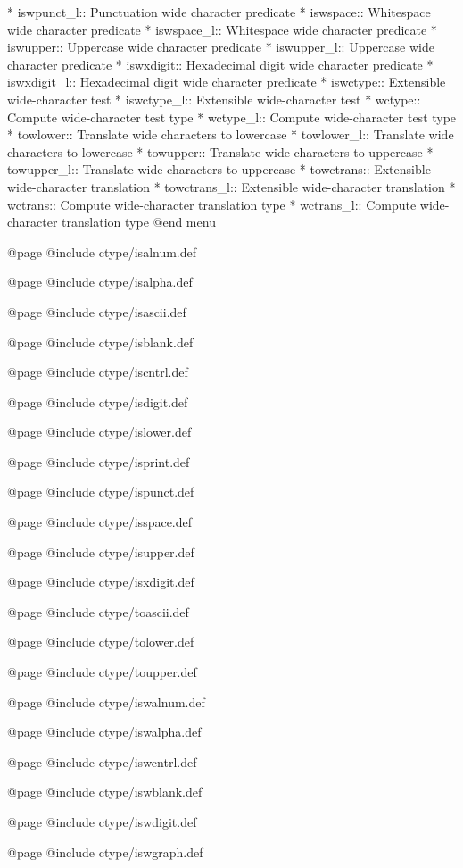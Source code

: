 * iswpunct_l::  Punctuation wide character predicate
* iswspace::  Whitespace wide character predicate
* iswspace_l::  Whitespace wide character predicate
* iswupper::  Uppercase wide character predicate
* iswupper_l::  Uppercase wide character predicate
* iswxdigit:: Hexadecimal digit wide character predicate
* iswxdigit_l:: Hexadecimal digit wide character predicate
* iswctype::  Extensible wide-character test
* iswctype_l::  Extensible wide-character test
* wctype::    Compute wide-character test type
* wctype_l::    Compute wide-character test type
* towlower::  Translate wide characters to lowercase
* towlower_l::  Translate wide characters to lowercase
* towupper::  Translate wide characters to uppercase
* towupper_l::  Translate wide characters to uppercase
* towctrans:: Extensible wide-character translation
* towctrans_l:: Extensible wide-character translation
* wctrans::   Compute wide-character translation type
* wctrans_l::   Compute wide-character translation type
@end menu

@page
@include ctype/isalnum.def

@page
@include ctype/isalpha.def

@page
@include ctype/isascii.def

@page
@include ctype/isblank.def

@page
@include ctype/iscntrl.def

@page
@include ctype/isdigit.def

@page
@include ctype/islower.def

@page
@include ctype/isprint.def

@page
@include ctype/ispunct.def

@page
@include ctype/isspace.def

@page
@include ctype/isupper.def

@page
@include ctype/isxdigit.def

@page
@include ctype/toascii.def

@page
@include ctype/tolower.def

@page
@include ctype/toupper.def

@page
@include ctype/iswalnum.def

@page
@include ctype/iswalpha.def

@page
@include ctype/iswcntrl.def

@page
@include ctype/iswblank.def

@page
@include ctype/iswdigit.def

@page
@include ctype/iswgraph.def

